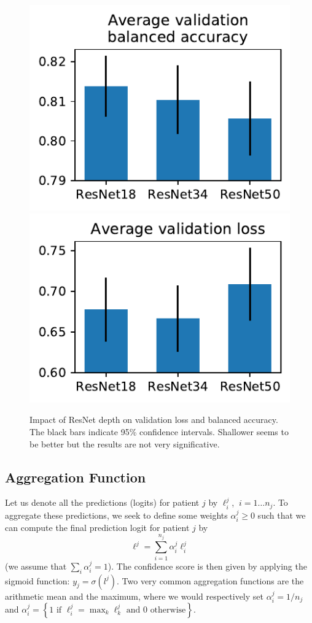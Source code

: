 \documentclass[final]{cvpr}
\begin{document}
\begin{figure}[t]
	\begin{center}
		\includegraphics[width=0.47\linewidth]{fig/resnets_bal_acc.pdf}
		\includegraphics[width=0.47\linewidth]{fig/resnets_val_loss.pdf}
	\end{center}
	\caption{Impact of ResNet depth on validation loss and balanced accuracy. The black bars indicate 95\% confidence intervals. Shallower seems to be better but the results are not very significative.}
	\label{fig:resnet}
\end{figure}


	\subsection{Aggregation Function}

Let us denote all the predictions (logits) for patient $j$ by $\ell_i^j$, $\: i=1 \dots n_j$.
To aggregate these predictions, we seek to define some weights $\alpha_i^j \geq 0$ such that we can compute the final prediction logit for patient $j$ by
$$\ell^j = \sum_{i=1}^{n_j} \alpha_i^j \ell_i^j$$
(we assume that $\sum_i \alpha_i^j = 1$).
The confidence score is then given by applying the sigmoid function: $y_j = \sigma(l^j)$.
Two very common aggregation functions are the arithmetic mean and the maximum, where we would respectively set $\alpha_i^j = 1/n_j$ and $\alpha_i^j = \left\{ 1 \text{ if } \ell_i^j = \max_k \ell_k^j \text{ and } 0 \text{ otherwise}\right\}$.
\end{document}

